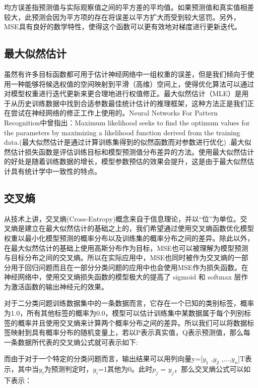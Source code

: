 均方误差指预测值与实际观察值之间的平方差的平均值。如果预测值和真实值相差较大，此预测会因为平方项的存在将误差以平方扩大而受到较大惩罚。另外，MSE具有良好的数学特性，使得这个函数可以更有效地对梯度进行更新迭代。

\subsection{最大似然估计}

虽然有许多目标函数都可用于估计神经网络中一组权重的误差，但是我们倾向于使用一种能够将候选权值的空间映射到平滑（高维）空间上，使得优化算法可以通过对模型权重进行迭代更新来更合理地进行权值修正。最大似然估计（MLE）是用于从历史训练数据中找到合适参数最佳统计估计的推理框架，这种方法正是我们正在尝试在神经网络的修正工作上使用的。Neural Networks For Pattern Recognition中曾指出：Maximum likelihood seeks to find the optimum values for the parameters by maximizing a likelihood function derived from the training data.(最大似然估计是通过计算训练集得到的似然函数而对参数进行优化) \cite{NeuralNetworkforPatternRecognize}.最大似然估计损失函数是评估训练目标和模型预测值分布差异的方法。使用最大似然估计的好处是随着训练数据的增长，模型参数预估的效果会提升，这是由于最大似然估计具有统计学中一致性的特点\cite{DeepLearning2016}。

\subsection{交叉熵}

从技术上讲，交叉熵(Cross-Entropy)概念来自于信息理论，并以“位”为单位。交叉熵是建立在最大似然估计的基础之上的，我们希望通过使用交叉熵函数优化模型权重以最小化模型预测的概率分布以及训练集的概率分布之间的差异。除此以外，在最大似然估计的基础上使用高斯分布作为目标，MSE也可以被理解为模型预测与目标分布之间的交叉熵。所以在实际应用中，MSE也同时被作为交叉熵的一部分用于回归问题而且在一部分分类问题的应用中也会使用MSE作为损失函数。在神经网络中，使用交叉熵损失函数的模型极大的提高了 sigmoid 和 softmax 层作为激活函数的输出神经元的效果。

对于二分类问题训练数据集中的一条数据而言，它存在一个已知的类别标签，概率为1.0，所有其他标签的概率为0.0，模型可以估计训练集中某数据属于每个列别标签的概率并且使用交叉熵来计算两个概率分布之间的差异。所以我们可以将数据标签映射到具有概率分布的随机变量上，若以P表示真实值，Q表示预测值，那么每一条数据所代表的交叉熵公式就可表示如下:



而由于对于一个特定的分类问题而言，输出结果可以用列向量y=[$y_{1}$ ,$y_{2}$ ,...,$y_{n}$]$\mathrm{T}$表示，其中当$y_{i}$为预测判定时，$y_{i}$=1其他为0。此时$p_{j}$ = $y_{j}$，那么交叉熵公式可以如下表示：




